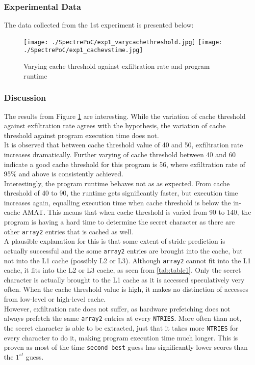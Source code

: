 \documentclass[10pt,twocolumn,letterpaper]{article}
\begin{document}
\subsubsection{Experimental Data}
The data collected from the 1st experiment is presented below:
\begin{figure}[htb]
	\centering
	\texttt{[image: ./SpectrePoC/exp1\_varycachethreshold.jpg]}
	\texttt{[image: ./SpectrePoC/exp1\_cachevstime.jpg]}
	\caption{Varying cache threshold against exfiltration rate and program runtime}
	\label{exp1}
\end{figure}
\subsubsection{Discussion}
The results from Figure \ref{exp1} are interesting. While the variation of cache threshold against exfiltration rate agrees with the hypothesis, the variation of cache threshold against program execution time does not.\\
It is observed that between cache threshold value of 40 and 50, exfiltration rate increases dramatically. Further varying of cache threshold between 40 and 60 indicate a good cache threshold for this program is 56, where exfiltration rate of 95\% and above is consistently achieved.\\
Interestingly, the program runtime behaves not as as expected. From cache threshold of 40 to 90, the runtime gets significantly faster, but execution time increases again, equalling execution time when cache threshold is below the in-cache AMAT. This means that when cache threshold is varied from 90 to 140, the program is having a hard time to determine the secret character as there are other \texttt{array2} entries that is cached as well.\\
A plausible explanation for this is that some extent of stride prediction is actually successful and the some \texttt{array2} entries are brought into the cache, but not into the L1 cache (possibly L2 or L3). Although \texttt{array2} cannot fit into the L1 cache, it fits into the L2 or L3 cache, as seen from \ref{tab:table1}. Only the secret character is actually brought to the L1 cache as it is accessed speculatively very often. When the cache threshold value is high, it makes no distinction of accesses from low-level or high-level cache.\\
However, exfiltration rate does not suffer, as hardware prefetching does not always prefetch the same \texttt{array2} entries at every \texttt{NTRIES}. More often than not, the secret character is able to be extracted, just that it takes more \texttt{NTRIES} for every character to do it, making program execution time much longer. This is proven as most of the time \texttt{second best} guess has significantly lower scores than the $1^{st}$ guess.\\
\end{document}
